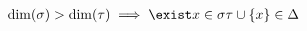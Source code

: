 \documentclass[preview]{standalone}
\begin{document}
\begin{align*}
\dim(\sigma)>\dim(\tau) \implies \exist x\in\sigma \tau\cup\{x\}\in\Delta
\end{align*}
\end{document}
